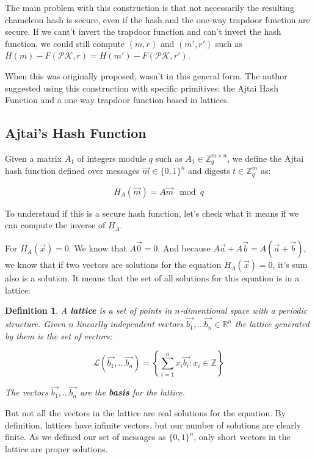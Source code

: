 \documentclass[a4paper]{article}
\newtheorem{definicao}{Definition}
\begin{document}
The main problem with this construction is that not necessarily the
resulting chameleon hash is secure, even if the hash and the one-way
trapdoor function are secure. If we cant't invert the trapdoor
function and can't invert the hash function, we could still compute
$(m, r)$ and $(m', r')$ such as $H(m) - F(\mathcal{PK}, r)=H(m') -
F(\mathcal{PK}, r')$.

When this was originally proposed, wasn't in this general form. The
author suggested using this construction with specific primitives: the
Ajtai Hash Function and a one-way trapdoor function based in lattices.

\subsection{Ajtai's Hash Function}

Given a matrix $A_1$ of integers module $q$ such as $A_1 \in
\mathbb{Z}_q^{m\times n}$, we define the Ajtai hash function defined
over messages $\overrightarrow{m} \in \{0,1\}^{n}$ and digests $t \in
\mathbb{Z}_q^m$ as:

$$
H_A(\overrightarrow{m}) = A\overrightarrow{m} \mod q
$$
 
To understand if this is a secure hash function, let's check what it
means if we can compute the inverse of $H_A$.

For $H_A(\overrightarrow{x})=0$. We know that
$A\overrightarrow{0}=0$. And because $A\overrightarrow{a} + A
\overrightarrow{b} = A(\overrightarrow{a}+\overrightarrow{b})$, we
know that if two vectors are solutions for the equation
$H_A(\overrightarrow{x})=0$, it's sum also is a solution. It means
that the set of all solutions for this equation is in a lattice:

\begin{definicao}
 A \textbf{lattice} is a set of points in $n$-dimentional space with a
 periodic structure. Given $n$ linearlly independent vectors
 $\overrightarrow{b_1},\ldots\overrightarrow{b_n} \in \mathbb{R}^n$
 the lattice generated by them is the set of vectors:
 
 $$
 \mathcal{L}(\overrightarrow{b_1},\ldots\overrightarrow{b_n})=\left\{\sum_{i=1}^nx_i\overrightarrow{b_i}
 : x_i \in \mathbb{Z}\right\}
 $$
 
 The vectors $\overrightarrow{b_1},\ldots\overrightarrow{b_n}$ are the
 \textbf{basis} for the lattice.
\end{definicao}
 
But not all the vectors in the lattice are real solutions for the
equation. By definition, lattices have infinite vectors, but our
number of solutions are clearly finite. As we defined our set of
messages as $\{0, 1\}^n$, only short vectors in the lattice are proper
solutions.
\end{document}
